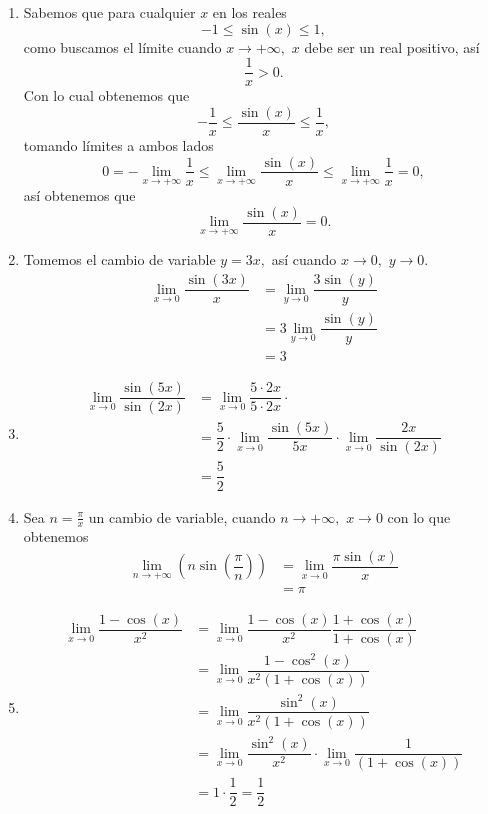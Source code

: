 \begin{example}
	\begin{enumerate}
		\item Sabemos que para cualquier \(x\) en los reales 
		\[-1\leq\sin(x)\leq 1,\]
		como buscamos el l\'imite cuando \(x\to +\infty,\) \(x\) debe ser un real positivo, as\'i
		\[\dfrac{1}{x}>0.\]
		Con lo cual obtenemos que
		\[-\dfrac{1}{x}\leq\dfrac{\sin(x)}{x}\leq\dfrac{1}{x},\]
		tomando l\'imites a ambos lados
		\[0=-\lim\limits_{x\to+\infty}\dfrac{1}{x}\leq\lim\limits_{x\to+\infty}\dfrac{\sin(x)}{x}\leq\lim\limits_{x\to+\infty}\dfrac{1}{x}=0,\]
		as\'i obtenemos que
		\[\lim\limits_{x\to+\infty}{\frac{\sin(x)}{x}}=0.\]
		
		\item Tomemos el cambio de variable \(y=3x,\) as\'i cuando \(x\to 0,\) \(y\to 0.\)
		\begin{align*}
		\lim\limits_{x\to 0}\dfrac{\sin(3x)}{x}&=\lim\limits_{y\to 0}\dfrac{3\sin(y)}{y}\\
		&=3\lim\limits_{y\to 0}\dfrac{\sin(y)}{y}\\
		&=3
		\end{align*}
		
		\item \begin{align*}
		\lim\limits_{x\to 0}\dfrac{\sin(5x)}{\sin(2x)}&=\lim\limits_{x\to 0}\dfrac{5\cdot 2x}{5\cdot 2x}\cdot\\
		&=\dfrac{5}{2}\cdot\lim\limits_{x\to 0}\dfrac{\sin(5x)}{5x}\cdot\lim\limits_{x\to 0}\dfrac{2x}{\sin(2x)}\\
		&=\dfrac{5}{2}
		\end{align*}
		
		\item Sea \(n=\frac{\pi}{x}\) un cambio de variable, cuando \(n\to+\infty,\) \(x\to 0\) con lo que obtenemos
		\begin{align*}
		\lim\limits_{n\to +\infty}\left(n\sin\left(\dfrac{\pi}{n}\right)\right)&=\lim\limits_{x\to 0}\dfrac{\pi\sin(x)}{x}\\
		&=\pi
		\end{align*}
		
		\item \begin{align*}
		\lim\limits_{x\to 0}\dfrac{1-\cos(x)}{x^2}&=\lim\limits_{x\to 0}\dfrac{1-\cos(x)}{x^2}\dfrac{1+\cos(x)}{1+\cos(x)}\\
		&=\lim\limits_{x\to 0}\dfrac{1-\cos^2(x)}{x^2(1+\cos(x))}\\
		&=\lim\limits_{x\to 0}\dfrac{\sin^2(x)}{x^2(1+\cos(x))}\\
		&=\lim\limits_{x\to 0}\dfrac{\sin^2(x)}{x^2}\cdot\lim\limits_{x\to 0}\dfrac{1}{(1+\cos(x))}\\
		&=1\cdot\dfrac{1}{2}=\dfrac{1}{2}
		\end{align*}
		

\end{enumerate}
\end{example}
